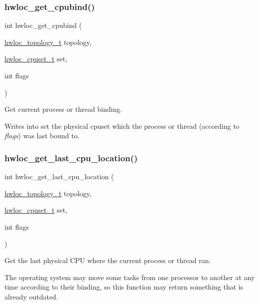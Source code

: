 \subsubsection{\texorpdfstring{hwloc\+\_\+get\+\_\+cpubind()}{hwloc\_get\_cpubind()}}
{\footnotesize\ttfamily int hwloc\+\_\+get\+\_\+cpubind (\begin{DoxyParamCaption}\item[{\hyperlink{a00186_ga9d1e76ee15a7dee158b786c30b6a6e38}{hwloc\+\_\+topology\+\_\+t}}]{topology,  }\item[{\hyperlink{a00183_ga4bbf39b68b6f568fb92739e7c0ea7801}{hwloc\+\_\+cpuset\+\_\+t}}]{set,  }\item[{int}]{flags }\end{DoxyParamCaption})}



Get current process or thread binding. 

Writes into {\ttfamily set} the physical cpuset which the process or thread (according to {\itshape flags}) was last bound to. \mbox{\label{a00190_gafdb374627358bf09203b5a4215b13032}} 
\subsubsection{\texorpdfstring{hwloc\+\_\+get\+\_\+last\+\_\+cpu\+\_\+location()}{hwloc\_get\_last\_cpu\_location()}}
{\footnotesize\ttfamily int hwloc\+\_\+get\+\_\+last\+\_\+cpu\+\_\+location (\begin{DoxyParamCaption}\item[{\hyperlink{a00186_ga9d1e76ee15a7dee158b786c30b6a6e38}{hwloc\+\_\+topology\+\_\+t}}]{topology,  }\item[{\hyperlink{a00183_ga4bbf39b68b6f568fb92739e7c0ea7801}{hwloc\+\_\+cpuset\+\_\+t}}]{set,  }\item[{int}]{flags }\end{DoxyParamCaption})}



Get the last physical C\+PU where the current process or thread ran. 

The operating system may move some tasks from one processor to another at any time according to their binding, so this function may return something that is already outdated.

